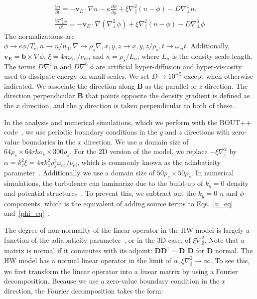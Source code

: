 \documentclass[letter,scriptaddress,twocolumn, prl,showkeys]{revtex4}
\def\beqar{\begin{eqnarray}}
\def\eeqar{\end{eqnarray}}
\newcommand{\pdiff}[2]{\frac{\partial#1}{\partial#2}}
\def\grad{\nabla}
\newcommand{\gradpar}{\grad_\parallel}
\newcommand{\gradperp}{\grad_\perp}
\begin{document}
\beqar
\label{n_eq}
\pdiff{n}{t} = - {\mathbf v_E} \cdot \grad n - \kappa \pdiff{\phi}{y} + \xi \gradpar^2 (n - \phi) - D \gradperp^4 n, \\
\label{phi_eq}
\pdiff{\gradperp^2 \phi}{t} = - {\mathbf v_E} \cdot \grad (\gradperp^2 \phi) + \xi \gradpar^2 (n - \phi) - D \gradperp^6 \phi
\eeqar
The normalizations are $\phi \to e \phi/T_e, n \to n/n_0, \grad \to \rho_s \grad , x,y,z \to x,y,z/\rho_s, t \to \omega_{ci} t $. Additionally,
$\mathbf{v_E} = \mathbf{b} \times \grad \phi$, $\xi = 4 \pi \omega_{ce}/\nu_{ei}$, 
and $\kappa = \rho_s/L_n$, where $L_n$ is the density scale length. The terms $D \gradperp^4 n$ and $D \gradperp^6 \phi$ are artificial hyper-diffusion and hyper-viscosity used to dissipate
energy on small scales. We set $D \to 10^{-5}$ except when otherwise indicated.
We associate the direction along $\mathbf{B}$ as the parallel or $z$ direction. The direction perpendicular $\mathbf{B}$ that
points opposite the density gradient is defined as the $x$ direction, and the $y$ direction is taken perpendicular to both of these.

In the analysis and numerical simulations, which we perform with the BOUT++ code~\cite{dudson2009}, we use periodic boundary conditions in
the $y$ and $z$ directions with zero-value boundaries in the $x$ direction. We use a domain size of $64 \rho_s \times 64 rho_s \times 300 \rho_s$.
For the 2D version of the model, we replace $-\xi \gradpar^2$ by $\alpha = k_z^2 \xi = 4 \pi k_z^2 \rho_s^2 \omega_{ce} /\nu_{ei}$, 
which is commonly known as the adiabaticity parameter~\cite{camargo1995,camargo1998}. Additionally we use a domain size of $50 \rho_s \times 50 \rho_s$.
In numerical simulations, the turbulence can laminarize due to the build-up of $k_y=0$ density and potential structures~\cite{biskamp1995}. To prevent this, we subtract out the $k_y=0$
$n$ and $\phi$ components, which is the equivalent of adding source terms to Eqs.~\ref{n_eq} and~\ref{phi_eq}~\cite{friedman2012b}.

The degree of non-normality of the linear operator in the HW model is largely a function of the adiabaticity parameter~\cite{camargo1998}, or in the 3D case, of $\xi \gradpar^2$. 
Note that a matrix is normal if it commutes with its adjoint: $\mathbf{D} \mathbf{D}^\dagger = \mathbf{D}^\dagger \mathbf{D}$ for $\mathbf{D}$ normal. 
The HW model has a normal linear operator in the limit of $\alpha, \xi \gradpar^2 \to \infty$. 
To see this, we first transform the linear operator into a linear matrix by using a Fourier decomposition. Because we use a zero-value boundary condition in the $x$ direction, the
Fourier decomposition takes the form:
\end{document}
